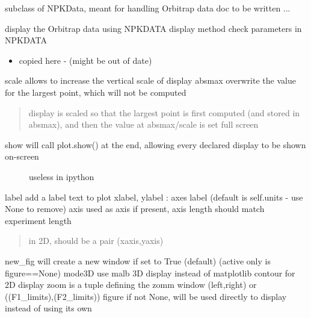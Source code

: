 \documentclass[letterpaper,10pt,openany,oneside]{sphinxmanual}
\begin{document}
\begin{fulllineitems}
\label{rst/code:Orbitrap.OrbiData}
subclass of NPKData, meant for handling Orbitrap data
doc to be written ...

\begin{fulllineitems}
\label{rst/code:Orbitrap.OrbiData.display}
display the Orbitrap data using NPKDATA display method
check parameters in NPKDATA
\begin{itemize}
\item {} 
copied here - (might be out of date)

\end{itemize}

scale   allows to increase the vertical scale of display
absmax  overwrite the value for the largest point, which will not be computed
\begin{quote}

display is scaled so that the largest point is first computed (and stored in absmax),
and then the value at absmax/scale is set full screen
\end{quote}
\begin{description}
\item[{show    will call plot.show() at the end, allowing every declared display to be shown on-screen}] \leavevmode
useless in ipython

\end{description}

label   add a label text to plot
xlabel, ylabel : axes label (default is self.units - use None to remove)
axis    used as axis if present, axis length should match experiment length
\begin{quote}

in 2D, should be a pair (xaxis,yaxis)
\end{quote}

new\_fig will create a new window if set to True (default) (active only is figure==None)
mode3D  use malb 3D display instead of matplotlib contour for 2D display
zoom    is a tuple defining the zomm window (left,right) or   ((F1\_limits),(F2\_limits))
figure  if not None, will be used directly to display instead of using its own


\end{fulllineitems}
\end{fulllineitems}
\end{document}
